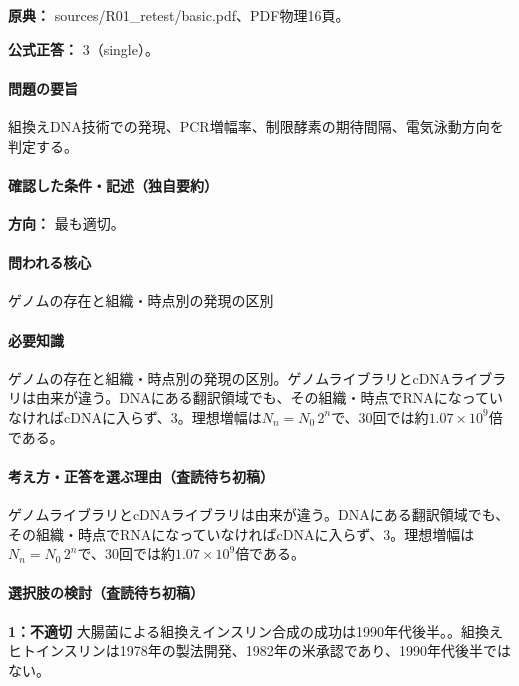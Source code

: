 \noindent\textbf{原典：} sources/R01\_retest/basic.pdf、PDF物理16頁。

\textbf{公式正答：} 3（single）。

\paragraph{問題の要旨} 組換えDNA技術での発現、PCR増幅率、制限酵素の期待間隔、電気泳動方向を判定する。

\paragraph{確認した条件・記述（独自要約）}\mbox{}\par

\noindent\textbf{方向：} 最も適切。\par

\paragraph{問われる核心} ゲノムの存在と組織・時点別の発現の区別

\paragraph{必要知識} ゲノムの存在と組織・時点別の発現の区別。ゲノムライブラリとcDNAライブラリは由来が違う。DNAにある翻訳領域でも、その組織・時点でRNAになっていなければcDNAに入らず、3。理想増幅は\(N_n=N_0\,2^n\)で、30回では約\(1.07\times10^9\)倍である。

\paragraph{考え方・正答を選ぶ理由（査読待ち初稿）} ゲノムライブラリとcDNAライブラリは由来が違う。DNAにある翻訳領域でも、その組織・時点でRNAになっていなければcDNAに入らず、3。理想増幅は\(N_n=N_0\,2^n\)で、30回では約\(1.07\times10^9\)倍である。

\paragraph{選択肢の検討（査読待ち初稿）}\mbox{}\par

\noindent\textbf{1：不適切} 大腸菌による組換えインスリン合成の成功は1990年代後半。。組換えヒトインスリンは1978年の製法開発、1982年の米承認であり、1990年代後半ではない。\par

